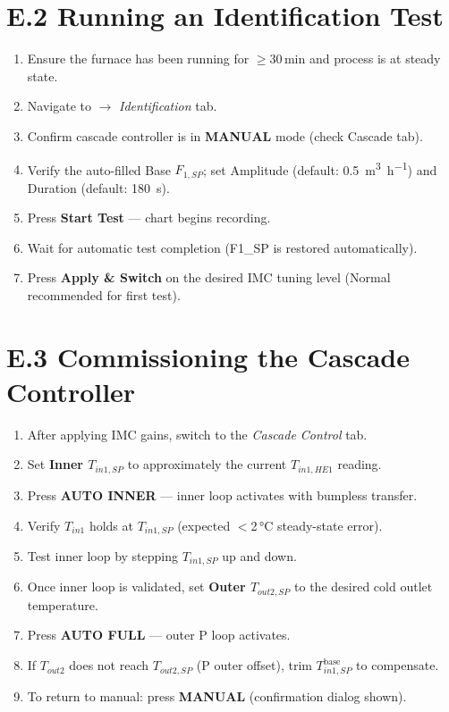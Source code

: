 \section*{E.2 \quad Running an Identification Test}

\begin{enumerate}[leftmargin=*, itemsep=4pt]
  \item Ensure the furnace has been running for $\geq$30\,min and process is at
    steady state.
  \item Navigate to  $\rightarrow$ \textit{Identification} tab.
  \item Confirm cascade controller is in \textbf{MANUAL} mode (check Cascade tab).
  \item Verify the auto-filled Base $F_{1,SP}$; set Amplitude (default:
    \SI{0.5}{\metre\cubed\per\hour}) and Duration (default: \SI{180}{\second}).
  \item Press \textbf{Start Test} --- chart begins recording.
  \item Wait for automatic test completion (F1\_SP is restored automatically).
  \item Press \textbf{Apply \& Switch} on the desired IMC tuning level (Normal recommended
    for first test).
\end{enumerate}

\section*{E.3 \quad Commissioning the Cascade Controller}

\begin{enumerate}[leftmargin=*, itemsep=4pt]
  \item After applying IMC gains, switch to the \textit{Cascade Control} tab.
  \item Set \textbf{Inner $T_{in1,SP}$} to approximately the current $T_{in1,HE1}$
    reading.
  \item Press \textbf{AUTO INNER} --- inner loop activates with bumpless transfer.
  \item Verify $T_{in1}$ holds at $T_{in1,SP}$ (expected $<$2\,\si{\degreeCelsius}
    steady-state error).
  \item Test inner loop by stepping $T_{in1,SP}$ up and down.
  \item Once inner loop is validated, set \textbf{Outer $T_{out2,SP}$} to the desired
    cold outlet temperature.
  \item Press \textbf{AUTO FULL} --- outer P loop activates.
  \item If $T_{out2}$ does not reach $T_{out2,SP}$ (P outer offset), trim
    $T_{in1,SP}^{\text{base}}$ to compensate.
  \item To return to manual: press \textbf{MANUAL} (confirmation dialog shown).
\end{enumerate}
